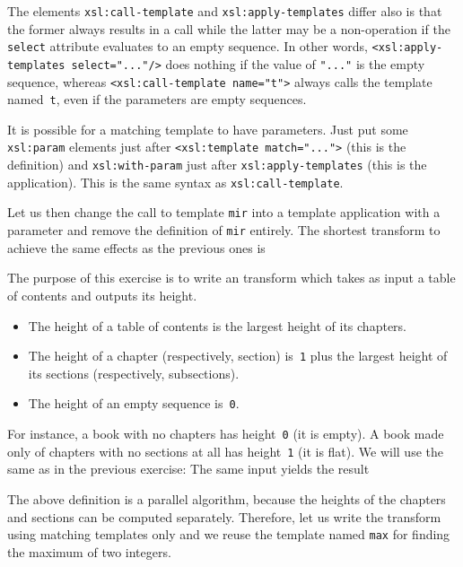 The elements \texttt{xsl:call-template} and
\texttt{xsl:apply-templates} differ also is that the former always
results in a call while the latter may be a non\hyp{}operation if the
\texttt{select} attribute evaluates to an empty sequence. In other
words, \texttt{<xsl:apply-templates select="..."/>} does nothing if the
value of \texttt{"..."} is the empty sequence, whereas
\texttt{<xsl:call-template name="t">} always calls the template named~\texttt{t}, even if the parameters are empty sequences.

It is possible for a matching template to have parameters. Just put
some \texttt{xsl:param} elements just after \texttt{<xsl:template
  match="...">} (this is the definition) and \texttt{xsl:with-param}
just after \texttt{xsl:apply-templates} (this is the
application). This is the same syntax as
\texttt{xsl:call-template}.

Let us then change the call to template \texttt{mir} into a template
application with a parameter and remove the definition of \texttt{mir}
entirely. The shortest transform to achieve the same effects as the
previous ones is


The purpose of this exercise is to write an \XSLT transform which
takes as input a table of contents and outputs its height.
\begin{itemize}

  \item The height of a table of contents is the largest height of its
  chapters.

  \item The height of a chapter (respectively, section) is~\texttt{1}
    plus the largest height of its sections (respectively,
    subsections).

  \item The height of an empty sequence is~\texttt{0}.

\end{itemize}
For instance, a book with no chapters has height~\texttt{0} (it is
empty). A book made only of chapters with no sections at all has
height~\texttt{1} (it is flat). We will use the same \DTD as in the
previous exercise:
\noindent The same input
\noindent yields the result

The above definition is a parallel algorithm, because the heights of
the chapters and sections can be computed separately. Therefore, let
us write the transform using matching templates only and we reuse the
template named \texttt{max} for finding the maximum of two integers.

